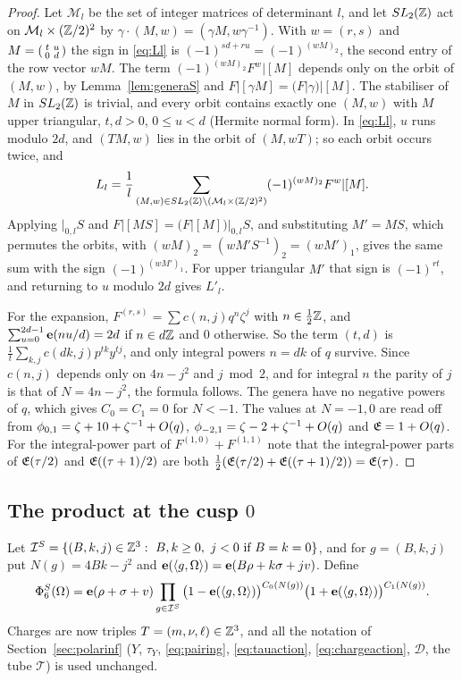\begin{proof}
Let $\mathcal M_l$ be the set of integer matrices of determinant $l$, and let $SL_2(\mathbb{Z})$ act on $\mathcal M_l\times(\mathbb{Z}/2)^2$ by $\gamma\cdot(M,w)=(\gamma M,w\gamma^{-1})$. With $w=(r,s)$ and $M=\begin{psmallmatrix}t&u\\0&d\end{psmallmatrix}$ the sign in \eqref{eq:Ll} is $(-1)^{sd+ru}=(-1)^{(wM)_2}$, the second entry of the row vector $wM$. The term $(-1)^{(wM)_2}F^w|[M]$ depends only on the orbit of $(M,w)$, by Lemma~\ref{lem:generaS} and $F|[\gamma M]=(F|\gamma)|[M]$. The stabiliser of $M$ in $SL_2(\mathbb{Z})$ is trivial, and every orbit contains exactly one $(M,w)$ with $M$ upper triangular, $t,d>0$, $0\le u<d$ (Hermite normal form). In \eqref{eq:Ll}, $u$ runs modulo $2d$, and $(TM,w)$ lies in the orbit of $(M,wT)$; so each orbit occurs twice, and
\[
L_l=\frac1l\sum_{(M,w)\in SL_2(\mathbb{Z})\backslash(\mathcal M_l\times(\mathbb{Z}/2)^2)}(-1)^{(wM)_2}F^w|[M].
\]
Applying $|_{0,l}S$ and $F|[MS]=(F|[M])|_{0,l}S$, and substituting $M'=MS$, which permutes the orbits, with $(wM)_2=(wM'S^{-1})_2=(wM')_1$, gives the same sum with the sign $(-1)^{(wM')_1}$. For upper triangular $M'$ that sign is $(-1)^{rt}$, and returning to $u$ modulo $2d$ gives $L'_l$.

For the expansion, $F^{(r,s)}=\sum c(n,j)q^n\zeta^j$ with $n\in\frac12\mathbb{Z}$, and $\sum_{u=0}^{2d-1}\mathbf e(nu/d)=2d$ if $n\in d\mathbb{Z}$ and $0$ otherwise. So the term $(t,d)$ is $\frac1t\sum_{k,j}c(dk,j)p^{tk}y^{tj}$, and only integral powers $n=dk$ of $q$ survive. Since $c(n,j)$ depends only on $4n-j^2$ and $j\bmod2$, and for integral $n$ the parity of $j$ is that of $N=4n-j^2$, the formula follows. The genera have no negative powers of $q$, which gives $C_0=C_1=0$ for $N<-1$. The values at $N=-1,0$ are read off from $\phi_{0,1}=\zeta+10+\zeta^{-1}+O(q)$, $\phi_{-2,1}=\zeta-2+\zeta^{-1}+O(q)$ and $\mathfrak E=1+O(q)$. For the integral-power part of $F^{(1,0)}+F^{(1,1)}$ note that the integral-power parts of $\mathfrak E(\tau/2)$ and $\mathfrak E((\tau+1)/2)$ are both $\frac12(\mathfrak E(\tau/2)+\mathfrak E((\tau+1)/2))=\mathfrak E(\tau)$.
\end{proof}

\subsection{The product at the cusp \texorpdfstring{$0$}{0}}
Let $\mathcal I^S=\{(B,k,j)\in\ZZ^3:\ B,k\ge0,\ j<0\text{ if }B=k=0\}$, and for $g=(B,k,j)$ put $N(g)=4Bk-j^2$ and $\mathbf e(\langle g,\Omega\rangle)=\mathbf e(B\rho+k\sigma+j v)$. Define
\begin{equation}\label{eq:PhiS}
\Phi^S_6(\Omega)=\mathbf e(\rho+\sigma+v)\prod_{g\in\mathcal I^S}\big(1-\mathbf e(\langle g,\Omega\rangle)\big)^{C_0(N(g))}\big(1+\mathbf e(\langle g,\Omega\rangle)\big)^{C_1(N(g))}.
\end{equation}
Charges are now triples $T=(m,\nu,\ell)\in\mathbb{Z}^3$, and all the notation of Section~\ref{sec:polarinf} ($Y$, $\tau_Y$, \eqref{eq:pairing}, \eqref{eq:tauaction}, \eqref{eq:chargeaction}, $\mathcal D$, the tube $\mathcal T$) is used unchanged.

